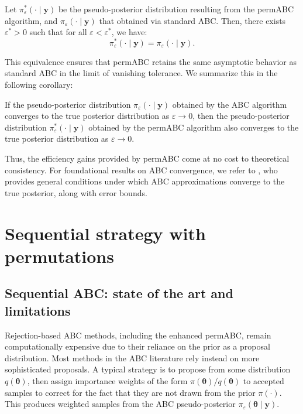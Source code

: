 \documentclass[lineno]{biometrika}
\def\obsdata{\mathbf{y}}
\def\param{\boldsymbol{\theta}}
\begin{document}
\begin{theorem}
\label{th:permABC_star}
Let $\pi^*_{\varepsilon}( \cdot \mid \obsdata)$ be the pseudo-posterior distribution resulting from the permABC algorithm, and $\pi_{\varepsilon}( \cdot \mid \obsdata)$ that obtained via standard ABC. Then, there exists $\varepsilon^*>0$ such that for all $\varepsilon < \varepsilon^*$, we have:
\[
\pi^*_{\varepsilon}( \cdot \mid \obsdata) = \pi_{\varepsilon}( \cdot \mid \obsdata).
\]
\end{theorem}

This equivalence ensures that permABC retains the same asymptotic behavior as standard ABC in the limit of vanishing tolerance. We summarize this in the following corollary:

\begin{corollary}
\label{col:permabc}
If the pseudo-posterior distribution $\pi_{\varepsilon}(\cdot \mid \obsdata)$ obtained by the ABC algorithm converges to the true posterior distribution as $\varepsilon \to 0$, then the pseudo-posterior distribution $\pi_{\varepsilon}^*(\cdot \mid \obsdata)$ obtained by the permABC algorithm also converges to the true posterior distribution as $\varepsilon \to 0$.
\end{corollary}

Thus, the efficiency gains provided by permABC come at no cost to theoretical consistency. For foundational results on ABC convergence, we refer to \citet{fearnhead2018abc}, who provides general conditions under which ABC approximations converge to the true posterior, along with error bounds.





\section{Sequential strategy with permutations}
\label{sec:sequential}

\subsection{Sequential ABC: state of the art and limitations}
\label{sec:abc_smc}
Rejection-based ABC methods, including the enhanced permABC, remain computationally expensive due to their reliance on the prior as a proposal distribution. 
Most methods in the ABC literature rely instead on more sophisticated proposals. A typical strategy is to propose from some distribution \( q(\param) \), then assign importance weights  of the form \( \pi(\param)/q(\param) \) to accepted samples to correct for the fact that they are not drawn from the prior \( \pi(\cdot) \). This produces weighted samples from the ABC pseudo-posterior \( \pi_\varepsilon(\param \mid \obsdata) \). 
\end{document}
